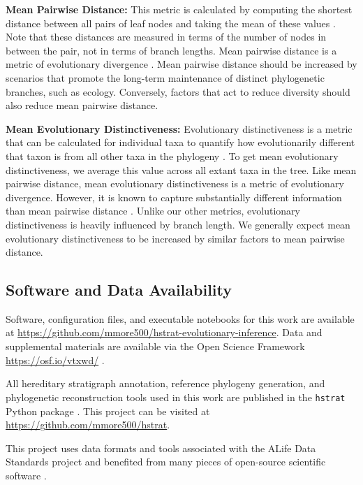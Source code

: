 \textbf{Mean Pairwise Distance:}
This metric is calculated by computing the shortest distance between all pairs of leaf nodes and taking the mean of these values \citep{webbExploringPhylogeneticStructure2000}.
Note that these distances are measured in terms of the number of nodes in between the pair, not in terms of branch lengths.
Mean pairwise distance is a metric of evolutionary divergence \citep{tuckerGuidePhylogeneticMetrics2017}.
Mean pairwise distance should be increased by scenarios that promote the long-term maintenance of distinct phylogenetic branches, such as ecology.
Conversely, factors that act to reduce diversity should also reduce mean pairwise distance.

\textbf{Mean Evolutionary Distinctiveness:}
Evolutionary distinctiveness is a metric that can be calculated for individual taxa to quantify how evolutionarily different that taxon is from all other taxa in the phylogeny \citep{isaacMammalsEDGEConservation2007}.
To get mean evolutionary distinctiveness, we average this value across all extant taxa in the tree.
Like mean pairwise distance, mean evolutionary distinctiveness is a metric of evolutionary divergence.
However, it is known to capture substantially different information than mean pairwise distance \citep{tuckerGuidePhylogeneticMetrics2017}.
Unlike our other metrics, evolutionary distinctiveness is heavily influenced by branch length.
We generally expect mean evolutionary distinctiveness to be increased by similar factors to mean pairwise distance.

\subsection{Software and Data Availability}

Software, configuration files, and executable notebooks for this work are available at \url{https://github.com/mmore500/hstrat-evolutionary-inference}.
Data and supplemental materials are available via the Open Science Framework \url{https://osf.io/vtxwd/} \citep{foster2017open}.

All hereditary stratigraph annotation, reference phylogeny generation, and phylogenetic reconstruction tools used in this work are published in the \texttt{hstrat} Python package \citep{moreno2022hstrat}.
This project can be visited at \url{https://github.com/mmore500/hstrat}.

This project uses data formats and tools associated with the ALife Data Standards project \citep{lalejini2019data} and benefited from many pieces of open-source scientific software \citep{ofria2020empirical,sand2014tqdist,2020SciPy-NMeth,harris2020array,reback2020pandas,mckinney-proc-scipy-2010,sukumaran2010dendropy,cock2009biopython}.
